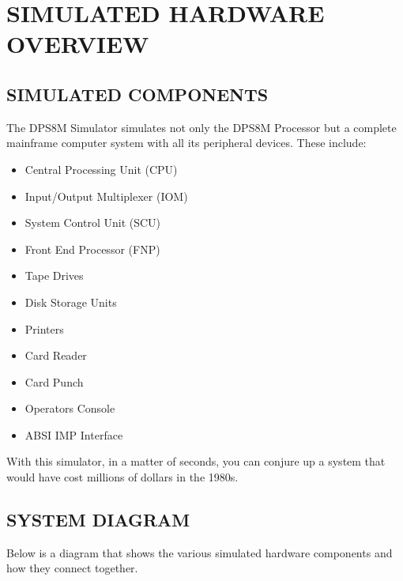 
\section[Simulated Hardware Overview]{SIMULATED HARDWARE OVERVIEW}

\subsection[Simulated Components]{SIMULATED COMPONENTS}

The DPS8M Simulator simulates not only the DPS8M Processor but a complete mainframe
computer system with all its peripheral devices. These include:
\begin{itemize}
	\item Central Processing Unit (CPU)
	\item Input/Output Multiplexer (IOM)
	\item System Control Unit (SCU)
	\item Front End Processor (FNP)
	\item Tape Drives
	\item Disk Storage Units
	\item Printers
	\item Card Reader
	\item Card Punch
	\item Operators Console
	\item ABSI IMP Interface
\end{itemize}

With this simulator, in a matter of seconds, you can conjure up a system that would
have cost millions of dollars in the 1980s.

\subsection[System Diagram]{SYSTEM DIAGRAM }

Below is a diagram that shows the various simulated hardware components and how they connect together.

